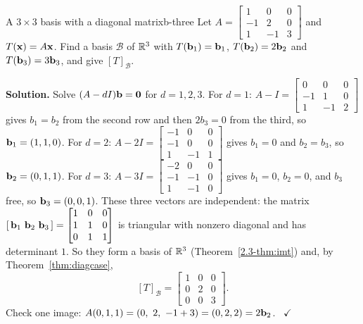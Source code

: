 \documentclass[11pt]{article}
\begin{document}
\begin{exmp}{A $3\times3$ basis with a diagonal matrix}{b-three}
Let $A=\begin{bmatrix}1&0&0\\-1&2&0\\1&-1&3\end{bmatrix}$ and $T(\mathbf{x})=A\mathbf{x}$. Find a basis $\mathcal{B}$ of $\mathbb{R}^3$ with $T(\mathbf{b}_1)=\mathbf{b}_1$, $T(\mathbf{b}_2)=2\mathbf{b}_2$ and $T(\mathbf{b}_3)=3\mathbf{b}_3$, and give $[T]_{\mathcal{B}}$.

\textbf{Solution.} Solve $(A-d I)\mathbf{b}=\mathbf{0}$ for $d=1,2,3$. For $d=1$: $A-I=\begin{bmatrix}0&0&0\\-1&1&0\\1&-1&2\end{bmatrix}$ gives $b_1=b_2$ from the second row and then $2b_3=0$ from the third, so $\mathbf{b}_1=(1,1,0)$. For $d=2$: $A-2I=\begin{bmatrix}-1&0&0\\-1&0&0\\1&-1&1\end{bmatrix}$ gives $b_1=0$ and $b_2=b_3$, so $\mathbf{b}_2=(0,1,1)$. For $d=3$: $A-3I=\begin{bmatrix}-2&0&0\\-1&-1&0\\1&-1&0\end{bmatrix}$ gives $b_1=0$, $b_2=0$, and $b_3$ free, so $\mathbf{b}_3=(0,0,1)$. These three vectors are independent: the matrix $[\,\bv{b}_1\ \bv{b}_2\ \bv{b}_3\,]=\begin{bmatrix}1&0&0\\1&1&0\\0&1&1\end{bmatrix}$ is triangular with nonzero diagonal and has determinant $1$. So they form a basis of $\mathbb{R}^3$ (Theorem~\ref{2.3-thm:imt}) and, by Theorem~\ref{thm:diagcase},
\[
[T]_{\mathcal{B}}=\begin{bmatrix}1&0&0\\0&2&0\\0&0&3\end{bmatrix}.
\]
Check one image: $A(0,1,1)=(0,\ 2,\ -1+3)=(0,2,2)=2\bv{b}_2$. \ $\checkmark$
\end{exmp}
\end{document}
